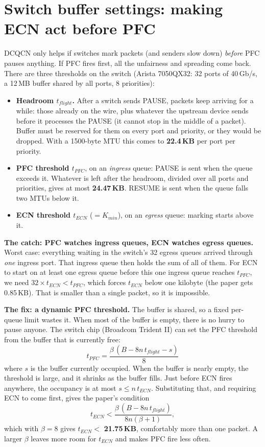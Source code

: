 \section{Switch buffer settings: making ECN act before PFC}

DCQCN only helps if switches mark packets (and senders slow down) \emph{before} PFC pauses anything. If PFC fires first, all the
unfairness and spreading come back. There are three thresholds on the switch (Arista 7050QX32: 32 ports of 40\,Gb/s, a 12\,MB buffer shared by all
ports, 8 priorities):
\begin{itemize}
  \item \textbf{Headroom $t_{flight}$.} After a switch sends PAUSE, packets keep arriving for a while: those already on the wire, plus whatever the
        upstream device sends before it processes the PAUSE (it cannot stop in the middle of a packet). Buffer must be reserved for them on every
        port and priority, or they would be dropped. With a 1500-byte MTU this comes to \textbf{22.4\,KB} per port per priority.
  \item \textbf{PFC threshold $t_{PFC}$}, on an \emph{ingress} queue: PAUSE is sent when the queue exceeds it. Whatever is left after the headroom,
        divided over all ports and priorities, gives at most \textbf{24.47\,KB}. RESUME is sent when the queue falls two MTUs below it.
  \item \textbf{ECN threshold $t_{ECN}$} ($= K_{min}$), on an \emph{egress} queue: marking starts above it.
\end{itemize}

\textbf{The catch: PFC watches ingress queues, ECN watches egress queues.} Worst case: everything waiting in the switch's 32 egress queues
arrived through \emph{one} ingress port. That ingress queue then holds the sum of all of them. For ECN to start on at least one egress queue
before this one ingress queue reaches $t_{PFC}$, we need $32 \times t_{ECN} < t_{PFC}$, which forces $t_{ECN}$ below one kilobyte (the paper
gets 0.85\,KB). That is smaller than a single packet, so it is impossible.

\textbf{The fix: a dynamic PFC threshold.} The buffer is shared, so a fixed per-queue limit wastes it. When most of the buffer is empty,
there is no hurry to pause anyone. The switch chip (Broadcom Trident II) can set the PFC threshold from the buffer that is currently free:
\[
  t_{PFC} = \frac{\beta\,(B - 8n\,t_{flight} - s)}{8}
\]
where $s$ is the buffer currently occupied. When the buffer is nearly empty, the threshold is large, and it shrinks as the buffer fills. Just before
ECN fires anywhere, the occupancy is at most $s \le n\,t_{ECN}$. Substituting that, and requiring ECN to come first, gives the paper's condition
\[
  t_{ECN} < \frac{\beta\,(B - 8n\,t_{flight})}{8n(\beta+1)},
\]
which with $\beta = 8$ gives $t_{ECN} < $ \textbf{21.75\,KB}, comfortably more than one packet. A larger $\beta$ leaves more room for $t_{ECN}$
and makes PFC fire less often.

